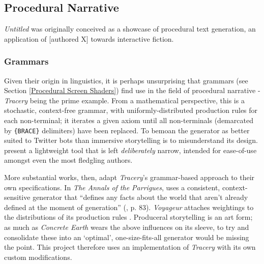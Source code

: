 \documentclass[a4paper, 11pt]{article}
\begin{document}
\begin{flushleft}
\vspace{5pt}

\vspace{5pt}

\subsection{Procedural Narrative} %

\textit{Untitled} was originally conceived as a showcase of procedural text generation, an application of [authored X] towards interactive fiction. 

\subsubsection{Grammars}

Given their origin in linguistics, it is perhaps unsurprising that grammars (see Section \ref{Procedural Screen Shaders}) find use in the field of procedural narrative - \textit{Tracery} \citep{comptonTracery} being the prime example. From a mathematical perspective, this is a stochastic, context-free grammar, with uniformly-distributed production rules for each non-terminal; it iterates a given axiom until all non-terminals (demarcated by \texttt{\{BRACE\}} delimiters) have been replaced. To bemoan the generator as better suited to Twitter bots than immersive storytelling is to misunderstand its design. \citeauthor{comptonTracery} present a lightweight tool that is left \textit{deliberately} narrow, intended for ease-of-use amongst even the most fledgling authors.

\vspace{5pt}\noindent
More substantial works, then, adapt \textit{Tracery}'s grammar-based approach to their own specifications. In \textit{The Annals of the Parrigues}, \citeauthor{shortParrigues} uses a consistent, context-sensitive generator that ``defines any facts about the world that aren’t already defined at the moment of generation'' (\citeyear{shortParrigues}, p. 83). \textit{Voyageur} \citep{diasVoyageur} attaches weightings to the distributions of its production rules \citep{diasVoyageurDescriptions}. Produceral storytelling is an art form; as much as \textit{Concrete Earth} wears the above influences on its sleeve, to try and consolidate these into an `optimal', one-size-fits-all generator would be missing the point. This project therefore uses an implementation of \textit{Tracery} with its own custom modifications.


\end{flushleft}
\end{document}
